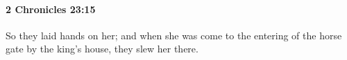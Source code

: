 
		\paragraph{2 Chronicles 23:15} %
			\label{2CHRONICLES-23-15}

			So they laid hands on her; and when she was come to the entering of the horse gate by the king's house, they slew her there.


